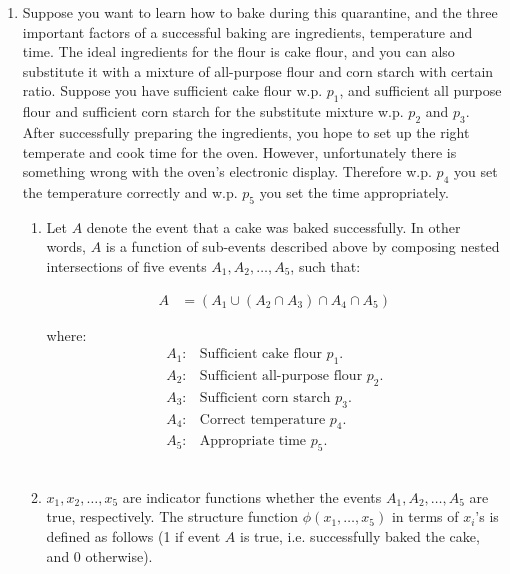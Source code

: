 \documentclass{article}
\begin{document}
\begin{enumerate}
\newpage
    \item Suppose you want to learn how to bake during this quarantine, and the three important factors of a successful baking are ingredients, temperature and time. The ideal ingredients for the flour is cake flour, and you can also substitute it with a mixture of all-purpose flour and corn starch with certain ratio. Suppose you have sufficient cake flour w.p. $p_1$, and sufficient all purpose flour and sufficient corn starch for the substitute mixture w.p. $p_2$ and $p_3$. After successfully preparing the ingredients, you hope to set up the right temperate and cook time for the oven. However, unfortunately there is something wrong with the oven’s electronic display. Therefore w.p. $p_4$ you set the temperature correctly and w.p. $p_5$ you set the time appropriately.\\

    \begin{enumerate}
        \item Let $A$ denote the event that a cake was baked successfully. In other words, $A$ is a function of sub-events described above by composing nested intersections of five events $A_1, A_2, \hdots, A_5$, such that:

        \begin{equation}
            \begin{split}
                A &= (A_1 \cup (A_2 \cap A_3) \cap A_4 \cap A_5)
            \end{split}
        \end{equation}

        where:\\
        \begin{equation}
            \begin{split}
                A_1: & \text{Sufficient cake flour } p_1.\\
                A_2: & \text{Sufficient all-purpose flour } p_2.\\
                A_3: & \text{Sufficient corn starch } p_3.\\
                A_4: & \text{Correct temperature } p_4.\\
                A_5: & \text{Appropriate time } p_5.
            \end{split}
        \end{equation}\\

        \item $x_1, x_2, \hdots, x_5$ are indicator functions whether the events $A_1, A_2, \hdots, A_5$ are true, respectively. The structure function $\phi(x_1, \hdots, x_5)$ in terms of $x_i$'s is defined as follows (1 if event $A$ is true, i.e. successfully baked the cake, and 0 otherwise). 


\end{enumerate}
\end{enumerate}
\end{document}

